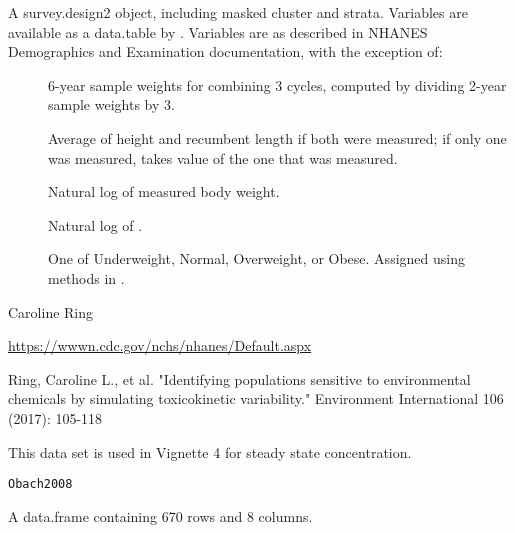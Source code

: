 \documentclass[a4paper]{book}
\begin{document}
\begin{Format}
A survey.design2 object, including masked cluster and strata.
Variables are available as a data.table by .
Variables are as described in NHANES Demographics and Examination
documentation, with the exception of: \begin{description}

\item[] 6-year sample weights for combining 3 cycles,
computed by dividing 2-year sample weights by 3.
\item[] Average of height and recumbent length if both
were measured; if only one was measured, takes value of the one that was
measured.\item[] Natural log of measured body weight.
\item[] Natural log of .
\item[] One of Underweight, Normal, Overweight, or Obese.
Assigned using methods in .
\end{description}

\end{Format}
%
\begin{Author}\relax
Caroline Ring
\end{Author}
%
\begin{Source}\relax
\url{https://wwwn.cdc.gov/nchs/nhanes/Default.aspx}
\end{Source}
%
\begin{References}\relax
Ring, Caroline L., et al. "Identifying populations sensitive to
environmental chemicals by simulating toxicokinetic variability." Environment
International 106 (2017): 105-118
\end{References}
%
\begin{Description}\relax
This data set is used in Vignette 4 for steady state concentration.
\end{Description}
%
\begin{Usage}
\begin{verbatim}
Obach2008
\end{verbatim}
\end{Usage}
%
\begin{Format}
A data.frame containing 670 rows and 8 columns.
\end{Format}
\end{document}

